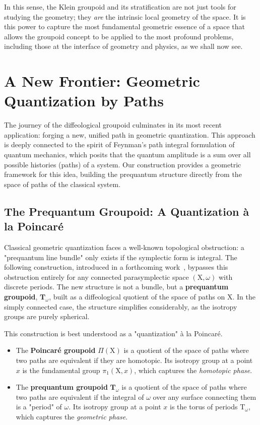 \documentclass[10pt,reqno,letterpaper,twoside]{amsart}
\theoremstyle{article}
\newcommand{\TT}{\mathbf{T}}
\def \T{\mathrm T}
\def \X{\mathrm X}
\begin{document}
  In this sense,
  the Klein groupoid and its stratification are not just tools for studying the geometry;
  they \emph{are} the intrinsic local geometry of the space.
  It is this power to capture the most fundamental geometric essence of a space that allows the groupoid concept to be applied to the most profound problems,
  including those at the interface of geometry and physics, as we shall now see.
  
  
  \section{A New Frontier: Geometric Quantization by Paths}
  
  The journey of the diffeological groupoid culminates in its most recent application:
  forging a new,
  unified path in geometric quantization.
  This approach is deeply connected to the spirit of Feynman's path integral formulation of quantum mechanics,
  which posits that the quantum amplitude is a sum over all possible histories (paths) of a system.
  Our construction provides a geometric framework for this idea,
  building the prequantum structure directly from the space of paths of the classical system.
  
  \subsection{The Prequantum Groupoid: A Quantization à la Poincaré}
  
  Classical geometric quantization faces a well-known topological obstruction:
  a "prequantum line bundle" only exists if the symplectic form is integral.
  The following construction,
  introduced in a forthcoming work~\cite{PIZ25b},
  bypasses this obstruction entirely for any connected parasymplectic space $(\X, \omega)$ with discrete periods.
  The new structure is not a bundle,
  but a \textbf{prequantum groupoid},
  $\TT_\omega$,
  built as a diffeological quotient of the space of paths on $\X$.
  In the simply connected case,
  the structure simplifies considerably,
  as the isotropy groups are purely spherical.
  
  This construction is best understood as a "quantization" à la Poincaré.
  
  \begin{itemize}
    \item The \textbf{Poincaré groupoid} $\Pi(\X)$ is a quotient of the space of paths where two paths are equivalent if they are homotopic.
    Its isotropy group at a point $x$ is the fundamental group $\pi_1(\X,x)$,
    which captures the \emph{homotopic phase}.
    \item The \textbf{prequantum groupoid} $\TT_\omega$ is a quotient of the space of paths where two paths are equivalent if the integral of $\omega$ over any surface connecting them is a "period" of $\omega$.
    Its isotropy group at a point $x$ is the torus of periods $\T_\omega$,
    which captures the \emph{geometric phase}.
  \end{itemize}
  
\end{document}
